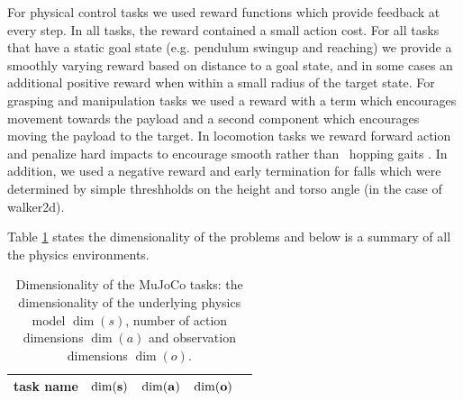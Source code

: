 \documentclass{article} %
\begin{document}
For physical control tasks we used reward functions which
provide feedback at every step. In all tasks, the reward contained a small
action cost. For all tasks that have a static goal state (e.g. pendulum
swingup and reaching) we provide a smoothly varying reward based
on distance to a goal state, and in some cases an additional positive
reward when within a small radius of the target state.
For grasping and manipulation tasks we used a reward with a
term which encourages movement towards the payload
and a second component which encourages moving the payload to the target.
In locomotion tasks we reward forward action and
penalize hard impacts to encourage smooth rather than \
hopping gaits \citep{schulman2015trust}. In addition,
we used a negative reward and early termination for falls
which were determined by simple threshholds on the height and
torso angle (in the case of walker2d).

Table \ref{table:dims} states the
dimensionality of the problems and below is a summary
of all the physics environments.

\begin{table}[h]
\begin{center}
  \begin{tabular}{ l | c | c | c | c }
\textbf{task name }&  $\bf \dim(s)$ & $\bf \dim(a)$
      & $\bf \dim(o)$ \\
      \hline
      
  \end{tabular}
  \caption{
    Dimensionality of the MuJoCo tasks: the dimensionality
    of the underlying physics model $\dim(s)$, number
    of action dimensions $\dim(a)$ and observation dimensions $\dim(o)$.
    } \label{table:dims}
\end{center}
\end{table}
\end{document}
